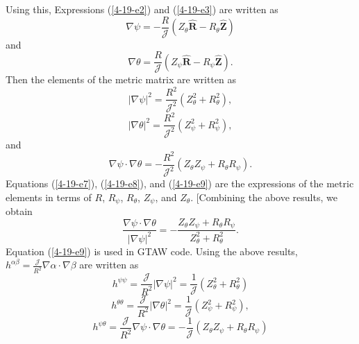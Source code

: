 \documentclass{llncs}
\begin{document}
Using this, Expressions (\ref{4-19-e2}) and (\ref{4-19-e3}) are written as
\begin{equation}
  \label{6-9-e1} \nabla \psi = - \frac{R}{\mathcal{J}} (Z_{\theta}
  \hat{\mathbf{R}} - R_{\theta} \hat{\mathbf{Z}})
\end{equation}
and
\begin{equation}
  \label{6-9-e2} \nabla \theta = \frac{R}{\mathcal{J}} (Z_{\psi}
  \hat{\mathbf{R}} - R_{\psi} \hat{\mathbf{Z}}) .
\end{equation}
Then the elements of the metric matrix are written as
\begin{equation}
  \label{4-19-e7} | \nabla \psi |^2 = \frac{R^2}{\mathcal{J}^2} (Z_{\theta}^2
  + R_{\theta}^2),
\end{equation}
\begin{equation}
  \label{4-19-e8} | \nabla \theta |^2 = \frac{R^2}{\mathcal{J}^2} (Z_{\psi}^2
  + R_{\psi}^2),
\end{equation}
and
\begin{equation}
  \label{4-19-e9} \nabla \psi \cdot \nabla \theta = -
  \frac{R^2}{\mathcal{J}^2} (Z_{\theta} Z_{\psi} + R_{\theta} R_{\psi}) .
\end{equation}
Equations (\ref{4-19-e7}), (\ref{4-19-e8}), and (\ref{4-19-e9}) are the
expressions of the metric elements in terms of $R$, $R_{\psi}$, $R_{\theta}$,
$Z_{\psi}$, and $Z_{\theta}$. [Combining the above results, we obtain
\begin{equation}
  \label{11-11-1} \frac{\nabla \psi \cdot \nabla \theta}{| \nabla \psi |^2} =
  - \frac{Z_{\theta} Z_{\psi} + R_{\theta} R_{\psi}}{Z_{\theta}^2 +
  R_{\theta}^2} .
\end{equation}
Equation (\ref{4-19-e9}) is used in GTAW code. Using the above results,
$h^{\alpha \beta} = \frac{\mathcal{J}}{R^2} \nabla \alpha \cdot \nabla \beta$
are written as
\begin{equation}
  h^{\psi \psi} = \frac{\mathcal{J}}{R^2} | \nabla \psi |^2 =
  \frac{1}{\mathcal{J}} (Z_{\theta}^2 + R_{\theta}^2)
\end{equation}
\begin{equation}
  h^{\theta \theta} = \frac{\mathcal{J}}{R^2} | \nabla \theta |^2 =
  \frac{1}{\mathcal{J}} (Z_{\psi}^2 + R_{\psi}^2),
\end{equation}
\begin{equation}
  h^{\psi \theta} = \frac{\mathcal{J}}{R^2} \nabla \psi \cdot \nabla \theta =
  - \frac{1}{\mathcal{J}} (Z_{\theta} Z_{\psi} + R_{\theta} R_{\psi})
\end{equation}
\end{document}
